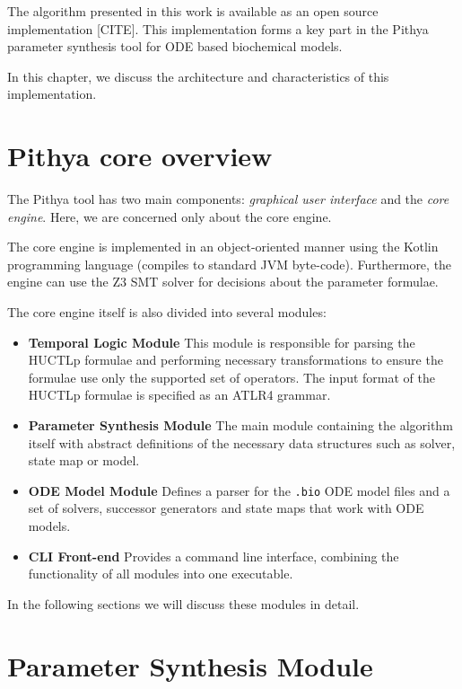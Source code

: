 The algorithm presented in this work is available as an open source implementation [CITE]. This implementation forms a key part in the Pithya parameter synthesis tool for ODE based biochemical models.

In this chapter, we discuss the architecture and characteristics of this implementation.

\section{Pithya core overview}

The Pithya tool has two main components: \emph{graphical user interface} and the \emph{core engine}. Here, we are concerned only about the core engine.

The core engine is implemented in an object-oriented manner using the Kotlin programming language (compiles to standard JVM byte-code). Furthermore, the engine can use the Z3 SMT solver for decisions about the parameter formulae.

The core engine itself is also divided into several modules:

\begin{itemize}
	\item \textbf{Temporal Logic Module} This module is responsible for parsing the \ac{HUCTLp} formulae and performing necessary transformations to ensure the formulae use only the supported set of operators. The input format of the \ac{HUCTLp} formulae is specified as an ATLR4 grammar.
	\item \textbf{Parameter Synthesis Module} The main module containing the algorithm itself with abstract definitions of the necessary data structures such as solver, state map or model.
	\item \textbf{ODE Model Module} Defines a parser for the \texttt{.bio} ODE model files and a set of solvers, successor generators and state maps that work with ODE models.
	\item \textbf{CLI Front-end} Provides a command line interface, combining the functionality of all modules into one executable.
\end{itemize}

In the following sections we will discuss these modules in detail.

\section{Parameter Synthesis Module}

